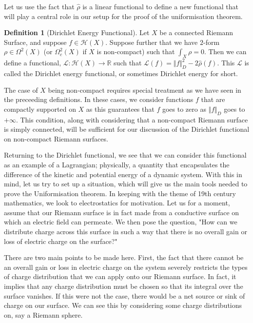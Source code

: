 \documentclass[11pt]{report}
\theoremstyle{definition}
\newtheorem{defn}[thm]{Definition}
\begin{document}
Let us use the fact that $\hat{\rho}$ is a linear functional to define a new functional that will play a central role in our setup for the proof of the uniformisation theorem.

\begin{defn}[Dirichlet Energy Functional]
  Let $X$ be a connected Riemann Surface, and suppose $f \in \mathcal{H}(X)$. Suppose further that we have $2$-form $\rho \in \Omega^2 (X)$ (or $\Omega^2_c (X)$ if $X$ is non-compact) such that $\int_X \rho = 0$. Then we can define a functional, $\mathcal{L}: 
  \mathcal{H}(X) \rightarrow \mathbb{R}$ such that $\mathcal{L}(f) = \Vert f\Vert ^2_D - 2\hat{\rho}(f)$. This $\mathcal{L}$ is called the Dirichlet energy functional, or sometimes Dirichlet energy for short.
\end{defn}

The case of $X$ being non-compact requires special treatment as we have seen in the preceeding definitions. In these cases, we consider functions $f$ that are compactly supported on $X$ as this guarantees that $f$ goes to zero as $\Vert f\Vert _D$ goes to $+\infty$. This condition, along with considering that a non-compact Riemann surface is simply connected, will be sufficient for our discussion of the Dirichlet functional on non-compact Riemann surfaces.

Returning to the Dirichlet functional, we see that we can consider this functional as an example of a Lagrangian; physically, a quantity that encapsulates the difference of the kinetic and potential energy of a dynamic system. With this in mind, let us try to set up a situation, which will give us the main tools needed to prove the Uniformisation theorem. In keeping with the theme of 19th century mathematics, we look to electrostatics for motivation. Let us for a moment, assume that our Riemann surface is in fact made from a conductive surface on which an electric field can permeate. We then pose the question, "How can we distribute charge across this surface in such a way that there is no overall gain or loss of electric charge on the surface?" 

There are two main points to be made here. First, the fact that there cannot be an overall gain or loss in electric charge on the system severely restricts the types of charge distribution that we can apply onto our Riemann surface. In fact, it implies that any charge distribution must be chosen so that its integral over the surface vanishes. If this were not the case, there would be a net source or sink of charge on our surface. We can see this by considering some charge distributions on, say a Riemann sphere. 
\end{document}

